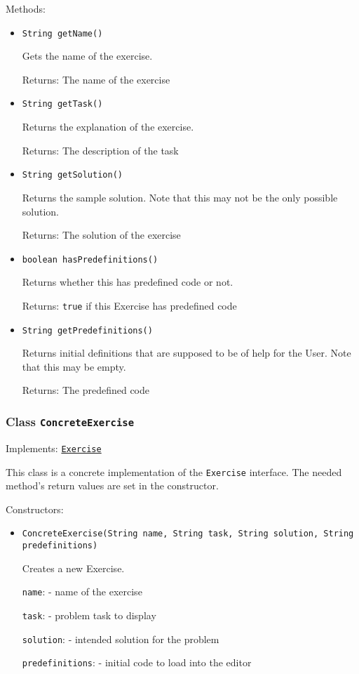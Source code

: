Methods:
\begin{itemize}
\item \texttt{String getName()}

Gets the name of the exercise.

Returns: The name of the exercise

\item \texttt{String getTask()}

Returns the explanation of the exercise.

Returns: The description of the task

\item \texttt{String getSolution()}

Returns the sample solution. Note that this may not be the only possible
 solution.

Returns: The solution of the exercise

\item \texttt{boolean hasPredefinitions()}

Returns whether this has predefined code or not.

Returns: \texttt{true} if this Exercise has predefined code

\item \texttt{String getPredefinitions()}

Returns initial definitions that are supposed to be of help for the User.
 Note that this may be empty.

Returns: The predefined code

\end{itemize}

\subsubsection{Class \texttt{ConcreteExercise}}
\label{type:edu.kit.wavelength.client.view.exercise.ConcreteExercise}
Implements: \texttt{\hyperref[type:edu.kit.wavelength.client.view.exercise.Exercise]{Exercise}}

This class is a concrete implementation of the \texttt{Exercise} interface.
 The needed method's return values are set in the constructor.

Constructors:
\begin{itemize}
\item \texttt{ConcreteExercise(String name, String task, String solution, String predefinitions)}

Creates a new Exercise.

\texttt{name}: - name of the exercise

\texttt{task}: - problem task to display

\texttt{solution}: - intended solution for the problem

\texttt{predefinitions}: - initial code to load into the editor

\end{itemize}

